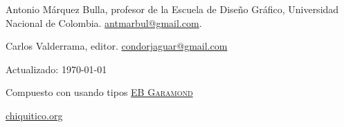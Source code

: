 \documentclass[12pt,letterpaper,final,usenames,dvipsnames]{article}
\begin{document}
Antonio Márquez Bulla, profesor de la Escuela de Diseño Gráfico, Universidad Nacional de Colombia. \href{mailto:antmarbul@gmail.com}{antmarbul@gmail.com}.
\vspace{6pt}

Carlos Valderrama, editor.  \href{mailto:condorjaguar@gmail.com}{condorjaguar@gmail.com}

\vfill


\begin{center}
{\large\PHplaneTree}

{\scriptsize  Actualizado: \today} 

{\scriptsize  Compuesto con \href{http://en.wikipedia.org/wiki/XeTeX}{\XeTeX} usando tipos \href{http://www.georgduffner.at/ebgaramond/index.html}{\textsc{EB Garamond}}}
\vspace{6pt}

{\large\href{http://chiquitico.org}{chiquitico.org}}
\end{center}
\end{document}

